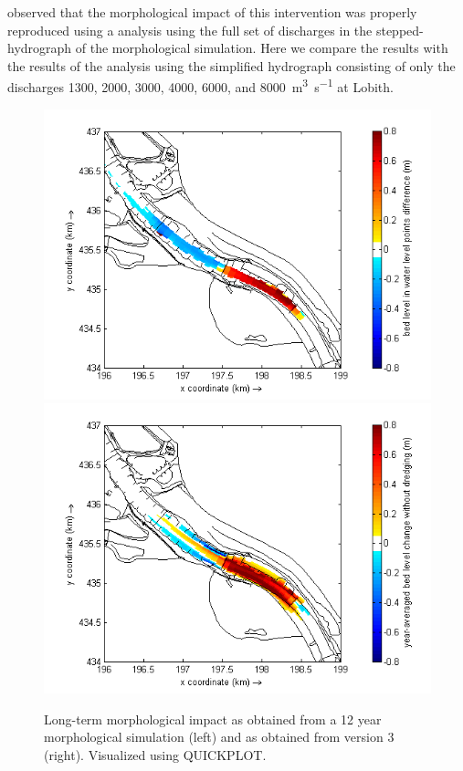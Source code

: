 \citet{GiriJagers2022} observed that the morphological impact of this intervention was properly reproduced using a \dfmi analysis using the full set of discharges in the stepped-hydrograph of the morphological simulation.
Here we compare the results with the results of the \dfmi analysis using the simplified hydrograph consisting of only the discharges 1300, 2000, 3000, 4000, 6000, and \SI{8000}{\metre\cubed\per\second} at Lobith.

\begin{figure}[b]
\includegraphics[width=\columnwidth/2]{figures/Pannerden_delft3d.png}
\includegraphics[width=\columnwidth/2]{figures/Pannerden_dfastmi.png}
\caption{Long-term morphological impact as obtained from a 12 year morphological simulation (left) and as obtained from \dfmi version 3 (right).
Visualized using QUICKPLOT.}
\label{Pannerden_mor}
\end{figure}

